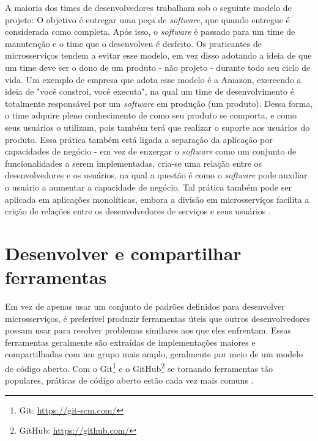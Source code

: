 A maioria dos times de desenvolvedores trabalham sob o seguinte modelo de projeto: O objetivo é entregar uma peça de \emph{software}, que quando entregue é considerada como completa. Após isso, o \emph{software} é passado para um time de manutenção e o time que o desenvolveu é desfeito. Os praticantes de microsserviços tendem a evitar esse modelo, em vez disso adotando a ideia de que um time deve ser o dono de um produto - não projeto - durante todo seu ciclo de vida. Um exemplo de empresa que adota esse modelo é a Amazon, exercendo a ideia de "você constroi, você executa", na qual um time de desenvolvimento é totalmente responsável por um \emph{software} em produção (um produto). Dessa forma, o time adquire pleno conhecimento de como seu produto se comporta, e como seus usuários o utilizam, pois também terá que realizar o suporte aos usuários do produto. Essa prática também está ligada a separação da aplicação por capacidades de negócio - em vez de enxergar o \emph{software} como um conjunto de funcionalidades a serem implementadas, cria-se uma relação entre os desenvolvedores e os usuários, na qual a questão é como o \emph{software} pode auxiliar o usuário a aumentar a capacidade de negócio. Tal prática também pode ser aplicada em aplicações monolíticas, embora a divisão em microsserviços facilita a crição de relações entre os desenvolvedores de serviços e seus usuários \cite{martin-fowler-microservices}.



\section{Desenvolver e compartilhar ferramentas}
Em vez de apenas usar um conjunto de padrões definidos para desenvolver microsserviços, é preferível produzir ferramentas úteis que outros desenvolvedores possam usar para resolver problemas similares aos que eles enfrentam. Essas ferramentas geralmente são extraídas de implementações maiores e compartilhadas com um grupo mais amplo, geralmente por meio de um modelo de código aberto. Com o Git\footnote{Git: \url{https://git-scm.com/}} e o GitHub\footnote{GitHub: \url{https://github.com/}} se tornando ferramentas tão populares, práticas de código aberto estão cada vez mais comuns \cite{martin-fowler-microservices}.

